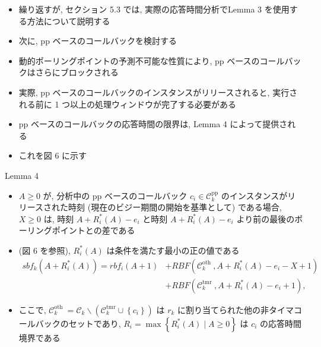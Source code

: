 \begin{frame}{}
    \begin{itemize}
        \item 繰り返すが, セクション 5.3 では, 実際の応答時間分析でLemma 3 を使用する方法について説明する
\item 次に, pp ベースのコールバックを検討する
\item 動的ポーリングポイントの予測不可能な性質により, pp ベースのコールバックはさらにブロックされる
\item 実際, pp ベースのコールバックのインスタンスがリリースされると, 実行される前に 1 つ以上の処理ウィンドウが完了する必要がある
\item pp ベースのコールバックの応答時間の限界は, Lemma 4 によって提供される
\item これを図 6 に示す
    \end{itemize}
\end{frame}

\begin{frame}[label=lemma4]{Lemma 4}
    \begin{lemma}[]
        \begin{itemize}
            \item $A \geq 0$ が, 分析中の pp ベースのコールバック $c_{i} \in \mathcal{C}_{k}^{\mathrm{pp}}$ のインスタンスがリリースされた時刻 (現在のビジー期間の開始を基準として) である場合, $X \geq 0$ は, 時刻 $A+R_{i}^{*}(A)-e_{i}$ と時刻 $A+R_{i}^{*}(A)-e_{i}$ より前の最後のポーリングポイントとの差である
\item (図 6 を参照), $R_{i}^{*}(A)$ は条件を満たす最小の正の値である
                  \begin{equation*}
                      \begin{aligned}
                          s b f_{k}\left(A+R_{i}^{*}(A)\right)=r b f_{i}(A+1) & +R B F\left(\mathcal{C}_{k}^{\text {oth }}, A+R_{i}^{*}(A)-e_{i}-X+1\right) \\
                                                                              & +R B F\left(\mathcal{C}_{k}^{\text {tmr }}, A+R_{i}^{*}(A)-e_{i}+1\right),
                      \end{aligned}
                  \end{equation*}
            \item ここで, $\mathcal{C}_{k}^{\text {oth }}=\mathcal{C}_{k} \backslash\left(\mathcal{C}_{k}^{\mathrm{tmr}} \cup\left\{c_{i}\right\}\right)$ は $r_{k}$ に割り当てられた他の非タイマコールバックのセットであり, $R_{i}=\max \left\{R_{i}^{*}(A) \mid A \geq 0\right\}$ は $c_{i}$ の応答時間境界である
        \end{itemize}
    \end{lemma}
\end{frame}

